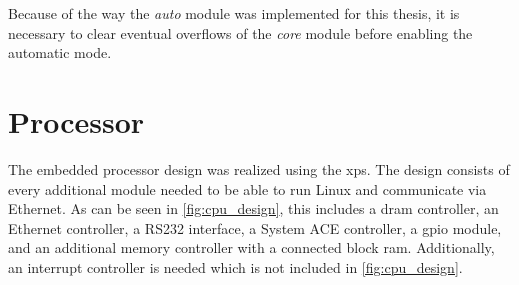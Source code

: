 \documentclass[12pt,a4paper,parskip=full,abstract=true,BCOR=12mm,twoside,open=right]{scrreprt}
\def\device#1{\textit{#1}}
\begin{document}
Because of the way the \device{auto} module was implemented for this thesis,
it is necessary to clear eventual overflows of the \device{core} module before
enabling the automatic mode.


\section{Processor}
\label{sec:processor}

The embedded processor design was realized using the \gls{xps}. The
design consists of every additional module needed to be
able to run Linux and communicate via Ethernet. As can be seen in
\cref{fig:cpu_design}, this includes a \gls{dram} controller, an
Ethernet controller, a RS232 interface, a System ACE controller,
a \gls{gpio} module, and an additional memory controller with a connected
block \gls{ram}. Additionally, an interrupt controller is needed which is
not included in \cref{fig:cpu_design}.
\end{document}
